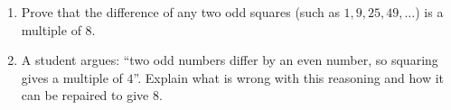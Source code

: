 \begin{enumerate}
\item[(a)] Prove that the difference of any two odd squares (such as $1,9,25,49,\dots$) is a multiple of $8$.
\item[(b)] A student argues: ``two odd numbers differ by an even number, so squaring gives a multiple of $4$''. Explain what is wrong with this reasoning and how it can be repaired to give $8$.
\end{enumerate}
